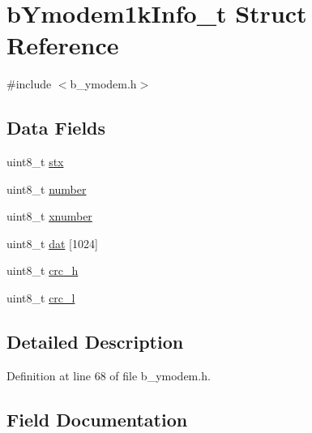 \hypertarget{structb_ymodem1k_info__t}{}\section{b\+Ymodem1k\+Info\+\_\+t Struct Reference}
\label{structb_ymodem1k_info__t}


{\ttfamily \#include $<$b\+\_\+ymodem.\+h$>$}

\subsection*{Data Fields}
\begin{DoxyCompactItemize}
\item 
uint8\+\_\+t \mbox{\hyperlink{structb_ymodem1k_info__t_a0016500d356f9144ad98cf2db5243a70}{stx}}
\item 
uint8\+\_\+t \mbox{\hyperlink{structb_ymodem1k_info__t_af57eaec6f3dec6de717735725c9908a6}{number}}
\item 
uint8\+\_\+t \mbox{\hyperlink{structb_ymodem1k_info__t_ae817be61f4d69f01a76ff417b23f5a54}{xnumber}}
\item 
uint8\+\_\+t \mbox{\hyperlink{structb_ymodem1k_info__t_a37f244daf59ff3faefec610b32f52584}{dat}} \mbox{[}1024\mbox{]}
\item 
uint8\+\_\+t \mbox{\hyperlink{structb_ymodem1k_info__t_a8b556a1f624d837372d1b7d09c747c8f}{crc\+\_\+h}}
\item 
uint8\+\_\+t \mbox{\hyperlink{structb_ymodem1k_info__t_aac2e6315c9d2f111fa40efaf5135ca54}{crc\+\_\+l}}
\end{DoxyCompactItemize}


\subsection{Detailed Description}


Definition at line 68 of file b\+\_\+ymodem.\+h.



\subsection{Field Documentation}
\mbox{\label{structb_ymodem1k_info__t_a8b556a1f624d837372d1b7d09c747c8f}} 

